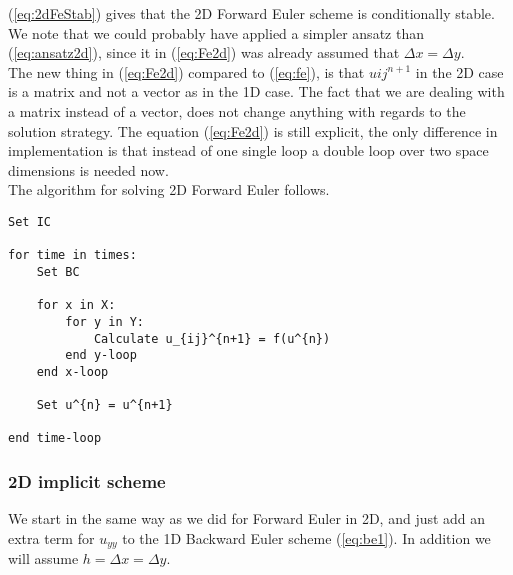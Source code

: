 \documentclass{article}
\begin{document}
(\ref{eq:2dFeStab}) gives that the 2D Forward Euler scheme is conditionally stable. We note that we could probably have applied a simpler ansatz than (\ref{eq:ansatz2d}), since it in (\ref{eq:Fe2d}) was already assumed that $\Delta x = \Delta y$. \\


The new thing in (\ref{eq:Fe2d}) compared to (\ref{eq:fe}), is that $u{ij}^{n+1}$ in the 2D case is a matrix and not a vector as in the 1D case. The fact that we are dealing with a matrix instead of a vector, does not change anything with regards to the solution strategy. The equation (\ref{eq:Fe2d}) is still explicit, the only difference in implementation is that instead of one single loop a double loop over two space dimensions is needed now.\\

The algorithm for solving 2D Forward Euler follows.

\begin{lstlisting}
Set IC

for time in times:
	Set BC
	
	for x in X:
		for y in Y:
			Calculate u_{ij}^{n+1} = f(u^{n})
		end y-loop
	end x-loop
	
	Set u^{n} = u^{n+1}	
	
end time-loop
\end{lstlisting}

\subsubsection{2D implicit scheme}
We start in the same way as we did for Forward Euler in 2D, and just add an extra term for $u_{yy}$ to the 1D Backward Euler scheme (\ref{eq:be1}). In addition we will assume $h = \Delta x = \Delta y$.
\end{document}
